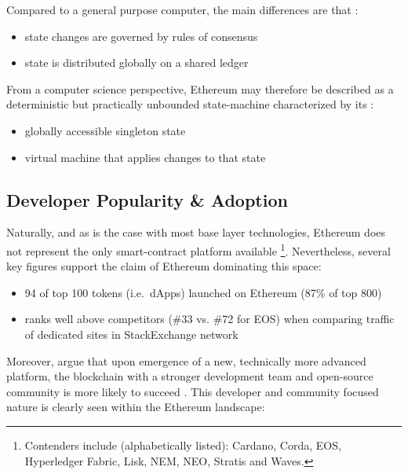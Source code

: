 Compared to a general purpose computer, the main differences are that \cite[p.~28]{Antonopoulos.2018}:

\begin{itemize}
  \item state changes are governed by rules of consensus
  \item state is distributed globally on a shared ledger
\end{itemize}

From a computer science perspective, Ethereum may therefore be described as a deterministic but practically unbounded state-machine characterized by its \cite[p.~23]{Antonopoulos.2018}: 

\begin{itemize}
  \item globally accessible singleton state
  \item virtual machine that applies changes to that state
\end{itemize}

\subsection{Developer Popularity \& Adoption}
\label{sec:ethereumPopularity}
Naturally, and as is the case with most base layer technologies, Ethereum does not represent the only smart-contract platform available \footnote{Contenders include (alphabetically listed): Cardano, Corda, EOS, Hyperledger Fabric, Lisk, NEM, NEO, Stratis and Waves.}. Nevertheless, several key figures support the claim of Ethereum dominating this space: 

\begin{itemize}
  \item 94 of top 100 tokens (i.e.~\acp{dApp}) launched on Ethereum (87\% of top 800) \cite{coinmarketTop100Tokens} \cite{ethereumNetworkState}
  \item ranks well above competitors (\#33 vs. \#72 for EOS) when comparing traffic of dedicated sites in StackExchange network \cite{stackExchangeTechnology}
\end{itemize}

Moreover, \citeauthor{10.1371/journal.pone.0169556} argue that upon emergence of a new, technically more advanced platform, the blockchain with a stronger development team and open-source community is more likely to succeed \cite[p.~14]{10.1371/journal.pone.0169556}. This developer and community focused nature is clearly seen within the Ethereum landscape:

